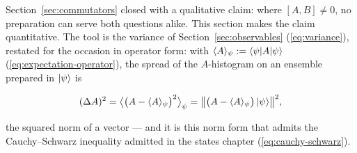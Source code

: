 Section~\ref{sec:commutators} closed with a qualitative claim: where $[A,B] \neq 0$, no preparation can serve both questions alike. This section makes the claim quantitative. The tool is the variance of Section~\ref{sec:observables} (\eqref{eq:variance}), restated for the occasion in operator form: with $\langle A\rangle_\psi := \braket{\psi|A|\psi}$ (\eqref{eq:expectation-operator}), the spread of the $A$-histogram on an ensemble prepared in $\ket{\psi}$ is
\begin{linenomath}
    \begin{equation}
        (\Delta A)^2 = \bigl\langle\bigl(A - \langle A\rangle_\psi\bigr)^2\bigr\rangle_\psi
        = \bigl\|\bigl(A - \langle A\rangle_\psi\bigr)\ket{\psi}\bigr\|^2 ,
    \end{equation}
\end{linenomath}
the squared norm of a vector --- and it is this norm form that admits the Cauchy--Schwarz inequality admitted in the states chapter (\eqref{eq:cauchy-schwarz}).

